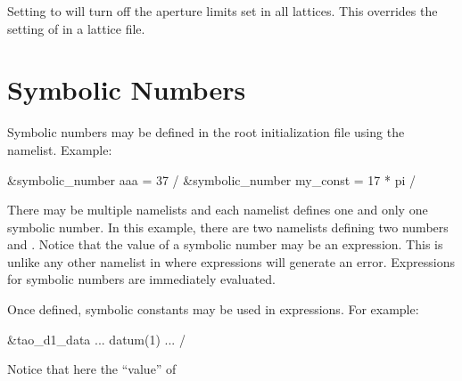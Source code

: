 {{{{{{{Setting  to  will turn off the aperture limits set in all
lattices. This overrides the setting of  in a lattice file.

\section{Symbolic Numbers}
\label{s:init.sym} 

Symbolic numbers may be defined in the root initialization file using the 
namelist. Example:
\begin{example}
  &symbolic_number aaa = 37 /
  &symbolic_number my_const = 17 * pi /
\end{example}
There may be multiple  namelists and each namelist defines one and only one
symbolic number. In this example, there are two namelists defining two numbers  and
. Notice that the value of a symbolic number may be an expression. This is unlike any
other namelist in \tao where expressions will generate an error. Expressions for symbolic numbers
are immediately evaluated.

Once defined, symbolic constants may be used in expressions. For example:
\begin{example}
  &tao_d1_data
    ...
    datum(1)%
    ...
  /
\end{example}
Notice that here the ``value'' of \vn{datum(1)%
the namelist is parsed.

Besides setting symbolic numbers in the main initialization file, symbolic numbers can be defined
using the \vn{set symbolic_number} command (\sref{s:set.symbolic}) and a list of symbolic numbers
can be printed using the \vn{show symbolic_number} command (\sref{s:show.symbolic}).

\section{Initializing Global Parameters}
\index{initialization!globals}
\label{s:globals} 

}}}}}}}}
